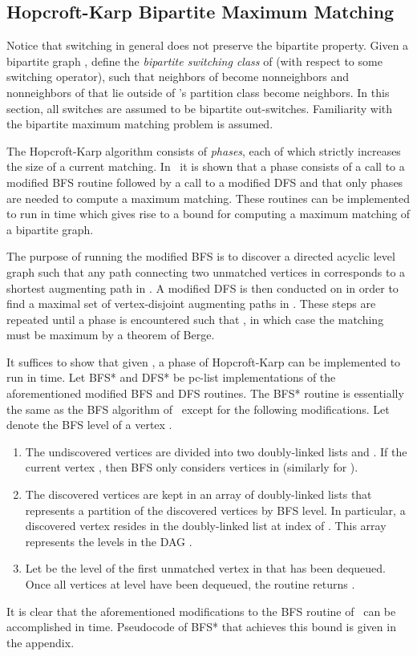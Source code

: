 \documentclass{llncs}
\begin{document}
\subsection{Hopcroft-Karp Bipartite Maximum Matching}

Notice that switching in general does not preserve the bipartite property.  Given a bipartite graph , define the \emph{bipartite switching class} of  (with respect to some switching operator), such that neighbors of  become nonneighbors and nonneighbors of  that lie outside of 's partition class become neighbors.  In this section, all switches are assumed to be bipartite out-switches.  Familiarity with the bipartite maximum matching problem is assumed.

The Hopcroft-Karp algorithm consists of \emph{phases}, each of which strictly increases the size of a current matching.  In~\cite{HopcroftK73} it is shown that a phase consists of a call to a modified BFS routine followed by a call to a modified DFS and that only  phases are needed to compute a maximum matching.  These routines can be implemented to run in  time which gives rise to a  bound for computing a maximum matching of a bipartite graph.  

The purpose of running the modified BFS is to discover a directed acyclic level graph  such that any path connecting two unmatched vertices in  corresponds to a shortest augmenting path in .  A modified DFS is then conducted on  in order to find a maximal set of vertex-disjoint augmenting paths  in . These steps are repeated until a phase is encountered such that , in which case the matching  must be maximum by a theorem of Berge. 

It suffices to show that given , a phase of Hopcroft-Karp can be implemented to run in  time. Let BFS* and DFS* be pc-list implementations of the aforementioned modified BFS and DFS routines.  The BFS* routine is essentially the same as the BFS algorithm of~\cite{DahlhausGM02} except for the following modifications.  Let  denote the BFS level of a vertex .
\begin{enumerate}
\item The undiscovered vertices are divided into two doubly-linked lists  and .  If the current vertex , then BFS only considers vertices in  (similarly for ).
\item The discovered vertices are kept in an array of doubly-linked lists  that represents a partition of the discovered vertices by BFS level.  In particular, a discovered vertex  resides in the doubly-linked list at index  of .  This array represents the levels in the DAG .
\item Let  be the level of the first unmatched vertex in  that has been dequeued. Once all vertices at level  have been dequeued, the routine returns .
\end{enumerate}
 It is clear that the aforementioned modifications to the BFS routine of~\cite{DahlhausGM02} can be accomplished in  time.  Pseudocode of BFS* that achieves this bound is given in the appendix.
 
\end{document}
